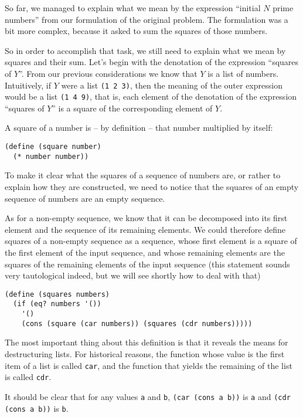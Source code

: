 So far, we managed to explain what we mean by the expression 
``initial $N$ prime numbers'' from our formulation of the original 
problem. The formulation was a bit more complex, because it asked
to sum the squares of those numbers.

So in order to accomplish that task, we still need to explain what
we mean by squares and their sum. Let's begin with the denotation
of the expression ``squares of $Y$''. From our previous
considerations we know that $Y$ is a list of numbers. Intuitively, 
if $Y$ were a list \texttt{(1 2 3)}, then the meaning of the outer
expression would be a list \texttt{(1 4 9)}, that is,
each element of the denotation of the expression ``squares of $Y$''
is a square of the corresponding element of $Y$.

A square of a number is -- by definition -- that number multiplied
by itself:

\begin{Verbatim}[samepage=true]
(define (square number)
  (* number number))
\end{Verbatim}

To make it clear what the squares of a sequence of numbers are, or
rather to explain how they are constructed, we need to notice that
the squares of an empty sequence of numbers are an empty sequence.

As for a non-empty sequence, we know that it can be decomposed into
its first element and the sequence of its remaining elements. We
could therefore define squares of a non-empty sequence as a sequence,
whose first element is a square of the first element of the input
sequence, and whose remaining elements are the squares of the
remaining elements of the input sequence (this statement sounds
very tautological indeed, but we will see shortly how to deal
with that)

\begin{Verbatim}[samepage=true]
(define (squares numbers)
  (if (eq? numbers '())
    '()
    (cons (square (car numbers)) (squares (cdr numbers)))))
\end{Verbatim}

The most important thing about this definition is that it reveals
the means for destructuring lists. For historical reasons, the
function whose value is the first item of a list is called
\texttt{car}, and the function that yields the remaining of
the list is called \texttt{cdr}.

It should be clear that for any values \texttt{a} and \texttt{b},
\texttt{(car (cons a b))} is \texttt{a} and \texttt{(cdr (cons a b))}
is \texttt{b}.

